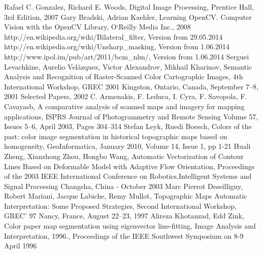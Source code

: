 \documentclass[a4paper,onecolumn,oneside,12pt]{memoir}
\begin{document}
\begin{thebibliography}{   }

          {Rafael C. Gonzalez, Richard E. Woods, Digital Image Processing, Prentice Hall, 3rd Edition, 2007}
          {Gary Bradski, Adrian Kaehler, Learning OpenCV. Computer Vision with the OpenCV Library,
          O`Reilly Media Inc., 2008}
          {http://en.wikipedia.org/wiki/Bilateral\_filter, Version from 29.05.2014}
          {http://en.wikipedia.org/wiki/Unsharp\_masking, Version from 1.06.2014}
          {http://www.ipol.im/pub/art/2011/bcm\_nlm/, Version from 1.06.2014}
          {Serguei Levachkine, Aurelio Velázquez, Victor Alexandrov, Mikhail Kharinov, 
          Semantic Analysis and Recognition of Raster-Scanned Color Cartographic Images,
          4th International Workshop, GREC 2001 Kingston, Ontario, Canada, September 7–8, 
          2001 Selected Papers, 2002}
          {C. Armenakis, F. Leduca, I. Cyra, F. Savopola, F. Cavayasb,
          A comparative analysis of scanned maps and imagery for mapping applications,
          ISPRS Journal of Photogrammetry and Remote Sensing Volume 57, Issues 5–6, April 2003,
          Pages 304–314}
          {Stefan Leyk, Ruedi Boesch, Colors of the past: color image segmentation in historical 
          topographic maps based on homogeneity, GeoInformatica, January 2010, Volume 14, Issue 1, pp 1-21 }
          {Huali Zheng, Xianzhong Zhou, Hongbo Wang, Automatic Vectorization of Contour Lines Based
          on Deformable Model with Adaptive Flow Orientation, Proceedings of the 2003 IEEE
          International Conference on Robotics,Intelligent Systems and Signal Processing
          Changsha, China - October 2003}
          {Marc Pierrot Deseilligny, Robert Mariani, Jacque Labiche, Remy Mullot,
          Topographic Maps Automatic Interpretation: Some Proposed Strategies, Second International
          Workshop, GREC' 97 Nancy, France, August 22–23, 1997}
          {Alireza Khotanzad, Edd Zink, Color paper map segmentation using eigenvector line-fitting,
          Image Analysis and Interpretation, 1996., Proceedings of the IEEE Southwest Symposium on
          8-9 April 1996}

\end{thebibliography}
\end{document}

